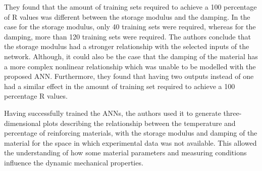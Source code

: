 \begin{enumerate}
    They found that the amount of training sets required to achieve a 100 percentage of R values was different between the storage modulus and the damping. In the case for the storage modulus, only 40 training sets were required, whereas for the damping, more than 120 training sets were required. The authors conclude that the storage modulus had a stronger relationship with the selected inputs of the network. Although, it could also be the case that the damping of the material has a more complex nonlinear relationship which was unable to be modelled with the proposed ANN. Furthermore, they found that having two outputs instead of one had a similar effect in the amount of training set required to achieve a 100 percentage R values.
    
    Having successfully trained the ANNs, the authors used it to generate three-dimensional plots describing the relationship between the temperature and percentage of reinforcing materials, with the storage modulus and damping of the material for the space in which experimental data was not available. This allowed the understanding of how some material parameters and measuring conditions influence the dynamic mechanical properties.
    

\end{enumerate}
